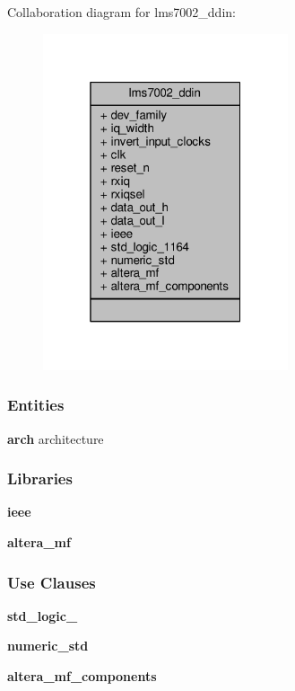 Collaboration diagram for lms7002\+\_\+ddin\+:\nopagebreak
\begin{figure}[H]
\begin{center}
\leavevmode
\includegraphics[width=205pt]{d7/dd6/classlms7002__ddin__coll__graph}
\end{center}
\end{figure}
\subsubsection*{Entities}
\begin{DoxyCompactItemize}
\item 
{\bf arch} architecture
\end{DoxyCompactItemize}
\subsubsection*{Libraries}
 \begin{DoxyCompactItemize}
\item 
{\bf ieee} 
\item 
{\bf altera\+\_\+mf} 
\end{DoxyCompactItemize}
\subsubsection*{Use Clauses}
 \begin{DoxyCompactItemize}
\item 
{\bf std\+\_\+logic\+\_}   
\item 
{\bf numeric\+\_\+std}   
\item 
{\bf altera\+\_\+mf\+\_\+components}   
\end{DoxyCompactItemize}
